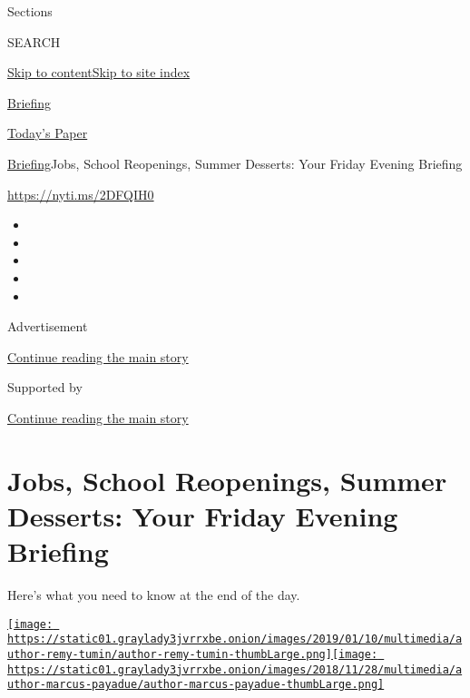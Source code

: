 Sections

SEARCH

\protect\hyperlink{site-content}{Skip to
content}\protect\hyperlink{site-index}{Skip to site index}

\href{https://www.nytimes3xbfgragh.onion/interactive/2018/briefing/global-morning-briefing-newsletter-signup.html}{Briefing}

\href{https://myaccount.nytimes3xbfgragh.onion/auth/login?response_type=cookie\&client_id=vi}{}

\href{https://www.nytimes3xbfgragh.onion/section/todayspaper}{Today's
Paper}

\href{/interactive/2018/briefing/global-morning-briefing-newsletter-signup.html}{Briefing}\textbar{}Jobs,
School Reopenings, Summer Desserts: Your Friday Evening Briefing

\url{https://nyti.ms/2DFQIH0}

\begin{itemize}
\item
\item
\item
\item
\item
\end{itemize}

Advertisement

\protect\hyperlink{after-top}{Continue reading the main story}

Supported by

\protect\hyperlink{after-sponsor}{Continue reading the main story}

\hypertarget{jobs-school-reopenings-summer-desserts-your-friday-evening-briefing}{%
\section{Jobs, School Reopenings, Summer Desserts: Your Friday Evening
Briefing}\label{jobs-school-reopenings-summer-desserts-your-friday-evening-briefing}}

Here's what you need to know at the end of the day.

\href{https://www.nytimes3xbfgragh.onion/by/remy-tumin}{\texttt{[image: https://static01.graylady3jvrrxbe.onion/images/2019/01/10/multimedia/author-remy-tumin/author-remy-tumin-thumbLarge.png]}}\href{https://www.nytimes3xbfgragh.onion/by/marcus-payadue}{\texttt{[image: https://static01.graylady3jvrrxbe.onion/images/2018/11/28/multimedia/author-marcus-payadue/author-marcus-payadue-thumbLarge.png]}}

